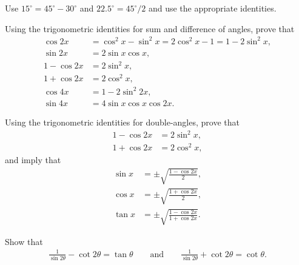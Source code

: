 \begin{solution}
    Use $15^{\circ} = 45^{\circ} - 30^{\circ}$ and $22.5^{\circ} = 45^{\circ}/2$ and use the appropriate identities.
\end{solution}


\begin{identity}
Using the trigonometric identities for sum and difference of angles, prove that
\begin{align}
    \cos 2x &= \cos^2 x - \sin^2 x = 2\cos^2 x - 1 =1 - 2\sin^2 x, \label{cos-double-angle}\\
    \sin 2x &= 2 \sin x \cos x, \label{sin-double-angle}\\
    1 - \cos 2x &= 2 \sin^2 x, \label{1-cos2x}\\
    1 + \cos 2x &= 2 \cos^2 x, \label{1+cos2x}\\
    \cos 4x &= 1 -2\sin^2 2x, \label{cos4x}\\
    \sin 4x &= 4 \sin x \cos x \cos 2x. \label{sin4x}
\end{align}
\end{identity}



\begin{identity}[$1\pm\cos 2x$]
Using the trigonometric identities for double-angles, prove that
\begin{align}
    1 - \cos 2x &= 2 \sin^2 x, \label{1-cos2x}\\
    1 + \cos 2x &= 2 \cos^2 x, \label{1+cos2x}
\end{align}
and imply that
\begin{align}
    \sin x & = \pm \sqrt{\frac{1-\cos 2x}{2}},\\
    \cos x & = \pm \sqrt{\frac{1+\cos 2x}{2}},\\
    \tan x & = \pm \sqrt{\frac{1-\cos 2x}{1+\cos 2x}}.
\end{align}
\end{identity}



\begin{tcolorbox}
    \begin{question}[name=($\cot x - \cot 2x$) Exercise Identity]\label{q:cot2x}
    Show that 
    \begin{align*}
        \frac{1}{\sin 2\theta} - \cot 2\theta =\tan \theta \qquad \text{and} \qquad \frac{1}{\sin 2\theta} + \cot 2\theta = \cot \theta.
    \end{align*}
\end{question}
\end{tcolorbox}

